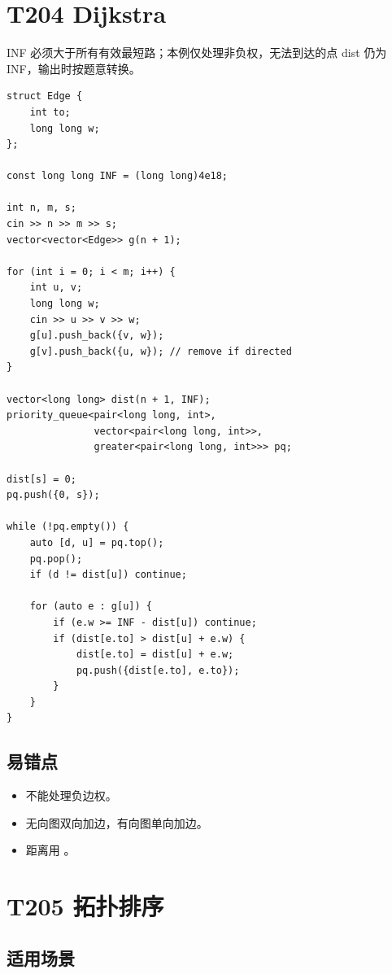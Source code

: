 \section{T204 Dijkstra}\label{sec:09-18}\label{tpl:204}

INF 必须大于所有有效最短路；本例仅处理非负权，无法到达的点 dist 仍为 INF，输出时按题意转换。

\begin{lstlisting}
struct Edge {
    int to;
    long long w;
};

const long long INF = (long long)4e18;

int n, m, s;
cin >> n >> m >> s;
vector<vector<Edge>> g(n + 1);

for (int i = 0; i < m; i++) {
    int u, v;
    long long w;
    cin >> u >> v >> w;
    g[u].push_back({v, w});
    g[v].push_back({u, w}); // remove if directed
}

vector<long long> dist(n + 1, INF);
priority_queue<pair<long long, int>,
               vector<pair<long long, int>>,
               greater<pair<long long, int>>> pq;

dist[s] = 0;
pq.push({0, s});

while (!pq.empty()) {
    auto [d, u] = pq.top();
    pq.pop();
    if (d != dist[u]) continue;

    for (auto e : g[u]) {
        if (e.w >= INF - dist[u]) continue;
        if (dist[e.to] > dist[u] + e.w) {
            dist[e.to] = dist[u] + e.w;
            pq.push({dist[e.to], e.to});
        }
    }
}
\end{lstlisting}

\subsection{易错点}

\begin{itemize}
  \item 不能处理负边权。
  \item 无向图双向加边，有向图单向加边。
  \item 距离用 。
\end{itemize}

\section{T205 拓扑排序}\label{sec:09-19}\label{tpl:205}

\subsection{适用场景}

